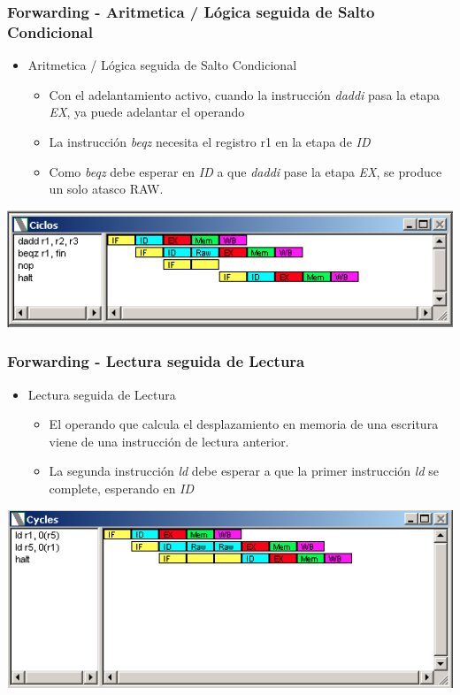 \documentclass{beamer}
\begin{document}
\begin{frame}[fragile]
\frametitle{Forwarding - Aritmetica / Lógica seguida de Salto Condicional}
\begin{itemize}
\item Aritmetica / Lógica seguida de Salto Condicional
\begin{itemize}
\item Con el adelantamiento activo, cuando la instrucción \emph{daddi} pasa la etapa \emph{EX}, ya puede adelantar el operando
\item La instrucción \emph{beqz} necesita el registro r1 en la etapa de \emph{ID}
\item Como \emph{beqz} debe esperar en \emph{ID} a que \emph{daddi} pase la etapa \emph{EX}, se produce un solo atasco RAW.
\end{itemize}
\end{itemize}
\includegraphics[scale=0.45]{forwarding-6-aritmetica-salto-condicional.png}
\end{frame}

\begin{frame}[fragile]
\frametitle{Forwarding - Lectura seguida de Lectura}
\begin{itemize}
\item Lectura seguida de Lectura
\begin{itemize}
\item El operando que calcula el desplazamiento en memoria de una escritura viene de una instrucción de lectura anterior.
\item La segunda instrucción \emph{ld} debe esperar a que la primer instrucción \emph{ld} se complete, esperando en \emph{ID}
\end{itemize}
\end{itemize}
\includegraphics[scale=0.45]{forwarding-7.png}
\end{frame}
\end{document}
